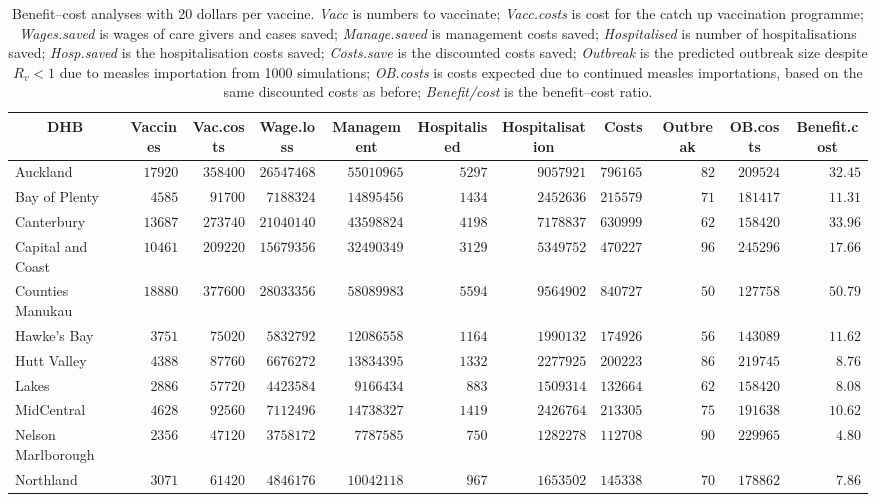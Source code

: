 \documentclass{article}
\begin{document}
\begin{itemize}
\begin{table}\small
\caption{Benefit--cost analyses with 20 dollars per vaccine. \textit{Vacc} is numbers to vaccinate; \textit{Vacc.costs} is cost for the catch up vaccination programme; \textit{Wages.saved} is wages of care givers and cases saved; \textit{Manage.saved} is management costs saved; \textit{Hospitalised} is number of hospitalisations saved; \textit{Hosp.saved} is the hospitalisation costs saved; \textit{Costs.save}	is the discounted costs saved; \textit{Outbreak}	is the predicted outbreak size despite $R_v < 1$ due to measles importation from 1000 simulations; \textit{OB.costs}	is costs expected due to continued measles importations, based on the same discounted costs as before; \textit{Benefit/cost} is the benefit--cost ratio.}
\begin{center}
\begin{tabular}{lrrrrrrrrrr}
\hline\hline
\multicolumn{1}{c}{DHB}&\multicolumn{1}{c}{Vaccines}&\multicolumn{1}{c}{Vac.costs}&\multicolumn{1}{c}{Wage.loss}&\multicolumn{1}{c}{Management}&\multicolumn{1}{c}{Hospitalised}&\multicolumn{1}{c}{Hospitalisation}&\multicolumn{1}{c}{Costs}&\multicolumn{1}{c}{Outbreak}&\multicolumn{1}{c}{OB.costs}&\multicolumn{1}{c}{Benefit.cost}\tabularnewline
\hline
Auckland&$17920$&$358400$&$26547468$&$55010965$&$5297$&$9057921$&$79616516$&$ 82$&$209524$&$32.45$\tabularnewline
Bay of Plenty&$ 4585$&$ 91700$&$ 7188324$&$14895456$&$1434$&$2452636$&$21557962$&$ 71$&$181417$&$11.31$\tabularnewline
Canterbury&$13687$&$273740$&$21040140$&$43598824$&$4198$&$7178837$&$63099902$&$ 62$&$158420$&$33.96$\tabularnewline
Capital and Coast&$10461$&$209220$&$15679356$&$32490349$&$3129$&$5349752$&$47022778$&$ 96$&$245296$&$17.66$\tabularnewline
Counties Manukau&$18880$&$377600$&$28033356$&$58089983$&$5594$&$9564902$&$84072731$&$ 50$&$127758$&$50.79$\tabularnewline
Hawke's Bay&$ 3751$&$ 75020$&$ 5832792$&$12086558$&$1164$&$1990132$&$17492688$&$ 56$&$143089$&$11.62$\tabularnewline
Hutt Valley&$ 4388$&$ 87760$&$ 6676272$&$13834395$&$1332$&$2277925$&$20022305$&$ 86$&$219745$&$ 8.76$\tabularnewline
Lakes&$ 2886$&$ 57720$&$ 4423584$&$ 9166434$&$ 883$&$1509314$&$13266438$&$ 62$&$158420$&$ 8.08$\tabularnewline
MidCentral&$ 4628$&$ 92560$&$ 7112496$&$14738327$&$1419$&$2426764$&$21330552$&$ 75$&$191638$&$10.62$\tabularnewline
Nelson Marlborough&$ 2356$&$ 47120$&$ 3758172$&$ 7787585$&$ 750$&$1282278$&$11270851$&$ 90$&$229965$&$ 4.80$\tabularnewline
Northland&$ 3071$&$ 61420$&$ 4846176$&$10042118$&$ 967$&$1653502$&$14533802$&$ 70$&$178862$&$ 7.86$\tabularnewline

\end{tabular}
\end{center}
\end{table}
\end{itemize}
\end{document}
